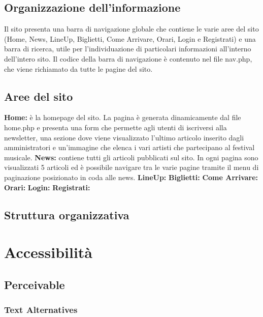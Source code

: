\documentclass[10pt, a4paper]{article}
\begin{document}
\subsection{Organizzazione dell'informazione}
Il sito presenta una barra di navigazione globale che contiene le varie aree del sito (Home, News, LineUp, Biglietti, Come Arrivare, Orari, Login e Registrati) e una barra di ricerca, utile per l'individuazione di particolari informazioni all'interno dell'intero sito.
Il codice della barra di navigazione è contenuto nel file nav.php, che viene richiamato da tutte le pagine del sito.
\subsection{Aree del sito}
\textbf{Home: }è la homepage del sito. La pagina è generata dinamicamente dal file home.php e presenta una form che permette agli utenti di iscriversi alla newsletter, una sezione dove viene visualizzato l'ultimo articolo inserito dagli amministratori e un'immagine che elenca i vari artisti che partecipano al festival musicale.
\newline \textbf{News: }contiene tutti gli articoli pubblicati sul sito. In ogni pagina sono visualizzati 5 articoli ed è possibile navigare tra le varie pagine tramite il menu di paginazione posizionato in coda alle news.
\newline \textbf{LineUp: }
\newline \textbf{Biglietti: }
\newline \textbf{Come Arrivare: }
\newline \textbf{Orari: }
\newline \textbf{Login: }
\newline \textbf{Registrati: }

\subsection{Struttura organizzativa}

\section{Accessibilità}

\subsection{Perceivable}

\subsubsection{Text Alternatives}
\end{document}
